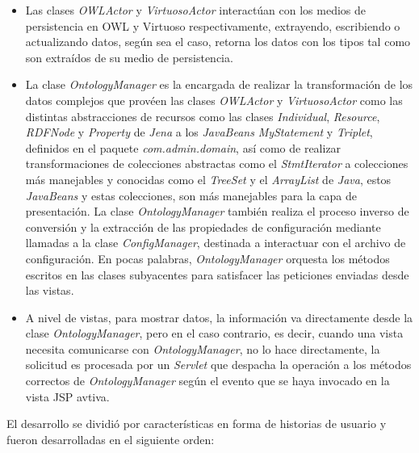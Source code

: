 \begin{itemize}
\begin{itemize}
    \item Las clases \textit{OWLActor} y \textit{VirtuosoActor} interactúan con los medios de persistencia en OWL y Virtuoso respectivamente, extrayendo, escribiendo o actualizando datos, según sea el caso, retorna los datos con los tipos tal como son extraídos de su medio de persistencia.
    \item La clase \textit{OntologyManager} es la encargada de realizar la transformación de los datos complejos que provéen las clases \textit{OWLActor} y \textit{VirtuosoActor} como las distintas abstracciones de recursos como las clases \textit{Individual}, \textit{Resource}, \textit{RDFNode} y \textit{Property} de \textit{Jena} a los \textit{JavaBeans} \textit{MyStatement} y \textit{Triplet}, definidos en el paquete \textit{com.admin.domain}, así como de realizar transformaciones de colecciones abstractas como el \textit{StmtIterator} a colecciones más manejables y conocidas como el \textit{TreeSet} y el \textit{ArrayList} de \textit{Java}, estos \textit{JavaBeans} y estas colecciones, son más manejables para la capa de presentación. La clase \textit{OntologyManager} también realiza el proceso inverso de conversión y la extracción de las propiedades de configuración mediante llamadas a la clase \textit{ConfigManager}, destinada a interactuar con el archivo de configuración. En pocas palabras, \textit{OntologyManager} orquesta los métodos escritos en las clases subyacentes para satisfacer las peticiones enviadas desde las vistas.
    \item A nivel de vistas, para mostrar datos, la información va directamente desde la clase \textit{OntologyManager}, pero en el caso contrario, es decir, cuando una vista necesita comunicarse con \textit{OntologyManager}, no lo hace directamente, la solicitud es procesada por un \textit{Servlet} que despacha la operación a los métodos correctos de \textit{OntologyManager} según el evento que se haya invocado en la vista JSP avtiva.

\end{itemize}

El desarrollo se dividió por características en forma de historias de usuario y fueron desarrolladas en el siguiente orden:


\end{itemize}

